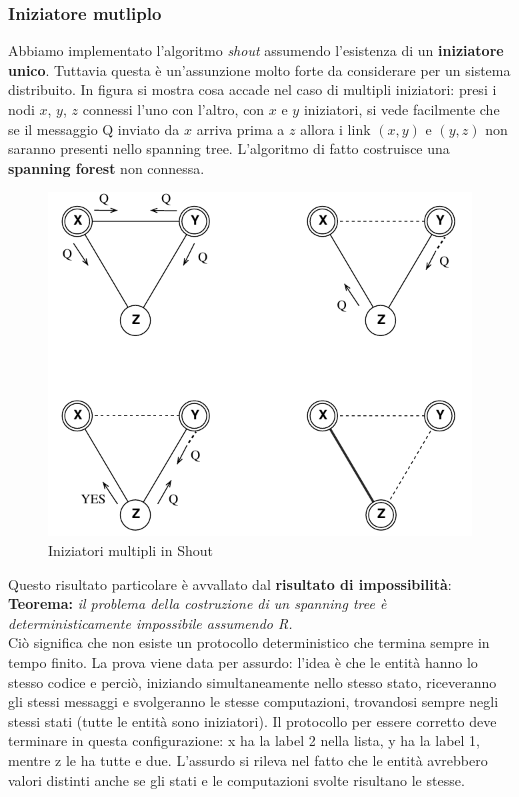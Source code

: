 \documentclass[12pt]{article}
\begin{document}
		\subsubsection{Iniziatore mutliplo}
			Abbiamo implementato l'algoritmo \textit{shout} assumendo l'esistenza di un \textbf{iniziatore unico}. Tuttavia questa è un'assunzione molto forte da considerare per un sistema distribuito. In figura si mostra cosa accade nel caso di multipli iniziatori: presi i nodi $x$, $y$, $z$ connessi l'uno con l'altro, con $x$ e $y$ iniziatori, si vede facilmente che se il messaggio Q inviato da $x$ arriva prima a $z$ allora i link $(x,y)$ e $(y,z)$ non saranno presenti nello spanning tree. L'algoritmo di fatto costruisce una \textbf{spanning forest} non connessa.
			\begin{figure}[h!]
				\centering
				\includegraphics[scale=0.35]{img/multip.png}
				\caption{Iniziatori multipli in Shout}
			\end{figure}
			Questo risultato particolare è avvallato dal \textbf{risultato di impossibilità}:\\
			\textbf{Teorema:} \textit{il problema della costruzione di un spanning tree è deterministicamente impossibile assumendo R.} \\
			Ciò significa che non esiste un protocollo deterministico che termina sempre in tempo finito.
			La prova viene data per assurdo: l'idea è che le entità hanno lo stesso codice e perciò, iniziando simultaneamente nello stesso stato, riceveranno gli stessi messaggi e svolgeranno le stesse computazioni, trovandosi sempre negli stessi stati (tutte le entità sono iniziatori). Il protocollo per essere corretto deve terminare in questa configurazione: x ha la label 2 nella lista, y ha la label 1, mentre z le ha tutte e due. L'assurdo si rileva nel fatto che le entità avrebbero valori distinti anche se gli stati e le computazioni svolte risultano le stesse. \\
\end{document}
